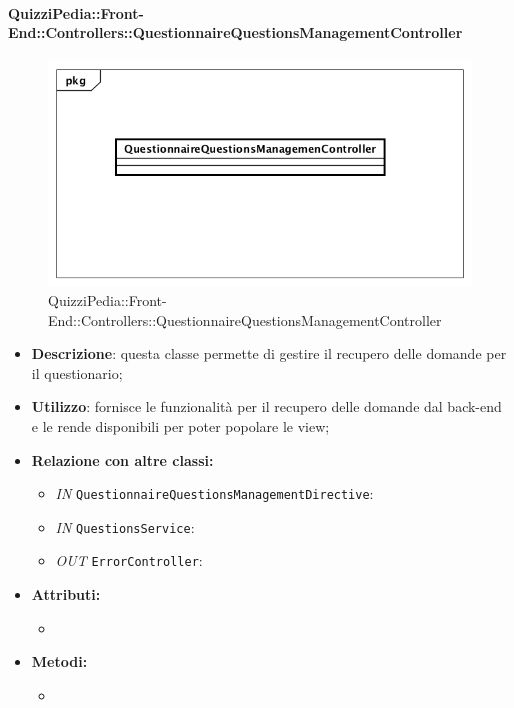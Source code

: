 \paragraph{QuizziPedia::Front-End::Controllers::QuestionnaireQuestionsManagementController}
\begin{figure}
	\centering
	\includegraphics[scale=0.45]{UML/Classi/Front-End/QuizziPedia_Front-end_Controller_QuestionnaireQuestionsManagementController.png}
	\caption{QuizziPedia::Front-End::Controllers::QuestionnaireQuestionsManagementController}
\end{figure}
\begin{itemize}
	\item \textbf{Descrizione}: questa classe permette di gestire il recupero delle domande per il questionario;
	\item \textbf{Utilizzo}: fornisce le funzionalità per il recupero delle domande dal back-end e le rende disponibili per poter popolare le view;
	\item \textbf{Relazione con altre classi:}
	\begin{itemize}
		\item \textit{IN} \texttt{QuestionnaireQuestionsManagementDirective}: 
		\item \textit{IN} \texttt{QuestionsService}: 
		\item \textit{OUT} \texttt{ErrorController}: 
	\end{itemize}
	\item \textbf{Attributi:}
	\begin{itemize}
		\item 
	\end{itemize}
	\item \textbf{Metodi:}
	\begin{itemize}
		\item 
	\end{itemize}
\end{itemize}

